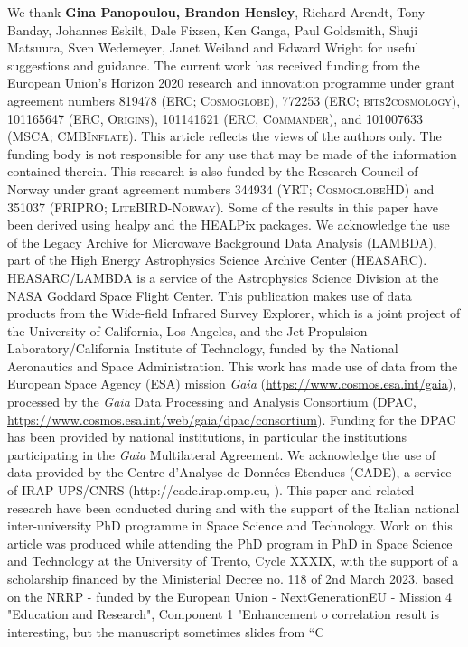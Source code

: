 \documentclass{aa}
\begin{document}
\begin{acknowledgements}
    We thank \textbf{Gina Panopoulou, Brandon Hensley}, Richard Arendt, Tony
    Banday, Johannes Eskilt, Dale Fixsen,
  Ken Ganga, Paul Goldsmith, Shuji Matsuura, Sven Wedemeyer, Janet
  Weiland and Edward Wright for useful suggestions and guidance.  The
  current work has received funding from the European Union’s Horizon
  2020 research and innovation programme under grant agreement numbers
  819478 (ERC; \textsc{Cosmoglobe}), 772253 (ERC;
  \textsc{bits2cosmology}), 101165647 (ERC, \textsc{Origins}),
  101141621 (ERC, \textsc{Commander}), and 101007633 (MSCA;
  \textsc{CMBInflate}).  This article reflects the views of the
  authors only. The funding body is not responsible for any use that
  may be made of the information contained therein. This research is
  also funded by the Research Council of Norway under grant agreement
  numbers 344934 (YRT; \textsc{CosmoglobeHD}) and 351037 (FRIPRO;
  \textsc{LiteBIRD-Norway}). Some of the results in this paper have been
  derived using healpy \citep{Zonca2019} and the HEALPix
  \citep{healpix} packages.  We acknowledge the use of the Legacy
  Archive for Microwave Background Data Analysis (LAMBDA), part of the
  High Energy Astrophysics Science Archive Center
  (HEASARC). HEASARC/LAMBDA is a service of the Astrophysics Science
  Division at the NASA Goddard Space Flight Center. This publication
  makes use of data products from the Wide-field Infrared Survey
  Explorer, which is a joint project of the University of California,
  Los Angeles, and the Jet Propulsion Laboratory/California Institute
  of Technology, funded by the National Aeronautics and Space
  Administration. This work has made use of data from the European
  Space Agency (ESA) mission {\it Gaia}
  (\url{https://www.cosmos.esa.int/gaia}), processed by the {\it Gaia}
  Data Processing and Analysis Consortium (DPAC,
  \url{https://www.cosmos.esa.int/web/gaia/dpac/consortium}). Funding
  for the DPAC has been provided by national institutions, in
  particular the institutions participating in the {\it Gaia}
  Multilateral Agreement.  We acknowledge the use of data provided by
  the Centre d'Analyse de Données Etendues (CADE), a service of
  IRAP-UPS/CNRS (http://cade.irap.omp.eu, \citealt{paradis:2012}).
  This paper and related research have been conducted during and with
  the support of the Italian national inter-university PhD programme
  in Space Science and Technology. Work on this article was produced
  while attending the PhD program in PhD in Space Science and
  Technology at the University of Trento, Cycle XXXIX, with the
  support of a scholarship financed by the Ministerial Decree no. 118
  of 2nd March 2023, based on the NRRP - funded by the European Union
  - NextGenerationEU - Mission 4 "Education and Research", Component 1
  "Enhancement o correlation result is interesting, but the manuscript sometimes slides from “C


\end{acknowledgements}
\end{document}
